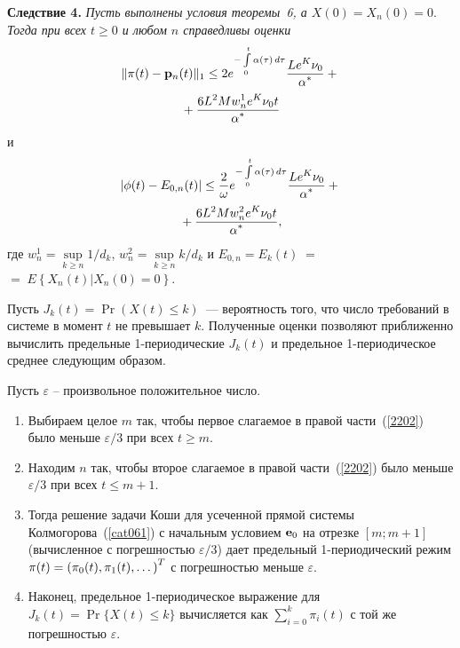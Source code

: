 \begin{multicols}{2}
\noindent
\textbf{Следствие 4.}
\textit{Пусть выполнены условия теоремы~6, а $X(0) = X_n (0) =
0.$ Тогда при всех  $t \ge 0$ и любом $n$ справедливы оценки}
\begin{multline}
\|{\bf \pi}(t) - {\bf p}_n (t)\|_{1} \le 2 e^{-\int\limits_0^t
\alpha(\tau)\, d\tau} \displaystyle\frac{\displaystyle L e^K\nu_0\mathstrut}{\displaystyle \alpha^*\mathstrut} +{}\\
{}+ \displaystyle\frac{\displaystyle 6L^2Mw_n^1
e^K\nu_0t\mathstrut}{\displaystyle \alpha^*\mathstrut} 
\label{2202}
\end{multline}
и
\begin{multline*}
\left|\phi(t) - E_{0,n}(t)\right| \le \displaystyle\frac{\displaystyle 2\mathstrut}{\displaystyle \omega\mathstrut}
e^{-\int\limits_0^t \alpha(\tau)\, d\tau} \displaystyle\frac{\displaystyle L
e^K\nu_0\mathstrut}{\displaystyle \alpha^*\mathstrut} + {}\\
{}+\displaystyle\frac{\displaystyle 6L^2Mw_n^2 e^K\nu_0t\mathstrut}{\displaystyle \alpha^*\mathstrut},
\end{multline*}
где $
w_n^1 = \sup\limits_{k\ge n} 1/d_k$, $ w_n^2 = \sup\limits_{k\ge n}
k/d_k$ и $E_{0,n} =E_k(t)\; =$\linebreak $=\;E\left\{X_n(t)\left|X_n(0)=0\right.\right\}$.


\medskip


Пусть $J_k(t) = \Pr \left(X(t) \le k\right) $~--- вероятность того,
что число требований в системе в момент $t$ не превышает $k$.
Полученные оценки позволяют приближенно вычислить предельные
1-периодические $J_k(t)$ и предельное 1-периодическое среднее
следующим образом.

\medskip

Пусть $\varepsilon$ -- произвольное положительное число.

\noindent
\begin{enumerate}
\item Выбираем целое  $m$ так, чтобы первое слагаемое в правой
части~(\ref{2202}) было меньше $ \varepsilon/3$ при всех $t \ge m$.
\item
Находим $n$ так, чтобы второе слагаемое в правой части~(\ref{2202}) 
было меньше $ \varepsilon/3$ при всех $t \le m+1$.
\item
Тогда решение задачи Коши для усеченной прямой системы
Колмогорова~(\ref{cat061}) с начальным условием ${\bf e}_0$ на
отрезке $[m;m+1]$ (вычисленное с погрешностью $\varepsilon/3$) дает
предельный 1-периодический режим ${\bf \pi}(t) =
\left(\pi_0(t),\pi_1(t),\dots\right)^T$ с погрешностью меньше
$\varepsilon$.
\item
Наконец, предельное 1-периодическое выражение для $J_k(t) =
\Pr\{X(t)\le k\}$ вычисляется как $\sum\limits_{i=0}^{k}\pi_i(t)$ с той же
погрешностью $\varepsilon$.
\end{enumerate}


\end{multicols}
